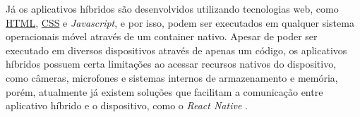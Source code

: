 Já os aplicativos híbridos são desenvolvidos utilizando tecnologias web, como \label{sig:HTML}\hyperlink{s:HTML}{HTML}, \label{sig:CSS}\hyperlink{s:CSS}{CSS} e \textit{Javascript}, e por isso, podem ser executados em qualquer sistema operacionais móvel através de um container nativo. Apesar de poder ser executado em diversos dispositivos através de apenas um código, os aplicativos híbridos	 possuem certa limitações ao acessar recursos nativos do dispositivo, como câmeras, microfones e sistemas internos de armazenamento e memória, porém, atualmente já existem soluções que facilitam a comunicação entre aplicativo híbrido e o dispositivo, como o \textit{React Native} \cite{MobileApps}.





